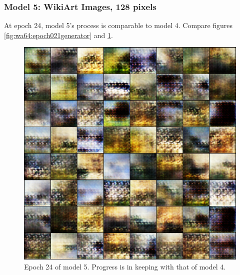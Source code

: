 \documentclass[11pt,letterpaper]{article}
\begin{document}
			\subsubsection{Model 5: WikiArt Images, 128 pixels}
				At epoch 24, model 5's process is comparable to model 4.
				Compare figures \ref{fig:wa64:epoch021generator} and \ref{fig:wa128:epoch024generator}.
				\begin{figure}
					\centering
					\includegraphics[width=1.0\linewidth]{results/model5/epoch024_generator}
					\caption{Epoch 24 of model 5. Progress is in keeping with that of model 4.}
					\label{fig:wa128:epoch024generator}
				\end{figure}
\end{document}
